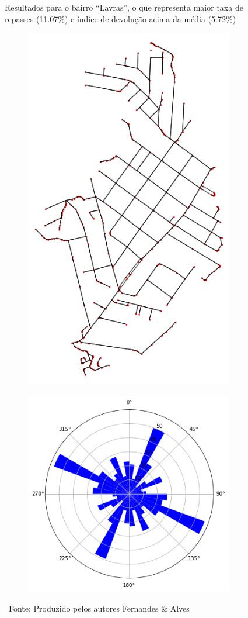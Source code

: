 \begin{figure}[htb]
    \centering
    \caption{Resultados para o bairro ``Lavras'', o que representa maior taxa de repasses (11.07\%) e índice de devolução acima da média (5.72\%)}
    \begin{subfigure}{0.42\textwidth}
        \includegraphics[height=0.75\textwidth]{images/5_emp_bebidas/street_network_analysis/Lavras_malha.png}
    \end{subfigure}
    \begin{subfigure}{0.42\textwidth}
        \includegraphics[height=0.75\textwidth]{images/5_emp_bebidas/street_network_analysis/Lavras_polar_plot.png}
    \end{subfigure}
    \caption*{\ Fonte: Produzido pelos autores Fernandes \& Alves}
    \label{fig:piorbairro_label}
\end{figure} %

